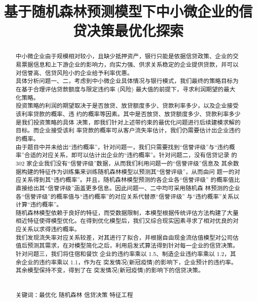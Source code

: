 \documentclass[bwprint]{cumcm}
\title{\heiti 基于随机森林预测模型下中小微企业的信贷决策最优化探索}
\newcommand{\deflabel}[1]{\bf #1\hfill}%
\newenvironment{myproblemlist}[1]%
{\begin{list}{}{\settowidth{\labelwidth}{\bf #1}%
			\setlength{\leftmargin}{\labelwidth}%
			\addtolength{\leftmargin}{\labelsep}%
			\renewcommand{\makelabel}{\deflabel}}}%
	{\end{list}}  %
\begin{document}
    \maketitle
\begin{abstract}
中小微企业由于规模相对较小，且缺少抵押资产，银行只能是依据信贷政策、企业的交易票据信息和上下游企业的影响力，向实力强、供求关系稳定的企业提供贷款，并可以对信誉高、信贷风险小的企业给予利率优惠。\\
\indent 具体分析问题一、二，考虑到中小微企业具体情况与银行模式，我们最终的策略目标为在基于合理评估贷款额度与限定违约率 (风险) 最大值的前提下，寻求利润期望的最大化策略。\\
\indent 投资策略的利润的期望取决于是否放贷、放贷额度多少、贷款利率多少，以及企业接受该利率贷款的概率、违 约的概率等因素。其中是否放贷、放贷额度多少、贷款利率多少是我们投资策略的具体 决策，即我们针对上述带约束的最优化问题进行后续建模求解的目标。而企业接受该利 率贷款的概率可从客户流失率估计，我们仍需要估计出企业违约的概率。\\
\indent 由于题目中并未给出“违约概率”，针对问题一，我们只需要找到“信誉评级”与“违约概 率”合适的对应关系，即可以估计出企业的“违约概率”。针对问题二，没有信贷记录 的 302 家企业我们没有“信誉评级”数据，从而我们利用问题一的“信誉评级”信息及 其余数据构建的特征作为训练集来训练随机森林模型以预测其“信誉评级”，从而由问 题一的对应关系得到其“违约概率”。并且，随机森林模型预测的各企业各“信誉评级” 的概率值比直接给出其“信誉评级”涵盖更多信息。因此问题一、二中均可采用随机森 林预测的企业各“信誉评级”的概率值与“违约概率”的对应关系代替原“信誉评级” 与“违约概率”关系以计算“违约概率”。\\
\indent 随机森林模型依赖于良好的特征，而受数据限制，本模型根据传统评估方法构建了大量相近特征使得模型优化。在得到优化模型后，我们又综合现实因素寻求了相对优良的对应关系以求得违约概率。\\
\indent 我们发现流失率对应关系较差，对其进行了拟合，并根据自由现金流估值模型对公司估值后预测其需求，在对模型简化之后，利用启发式算法得到针对每一企业的信贷决策。\\
\indent 针对问题三，我们将住宿和餐饮 企业的违约率乘以 1.5、制造企业违约率乘以 1.2，其余企业的违约率乘以 1.1，作为在 突发情况(新冠疫情)的影响下，企业预计的违约率。其余模型保持不变，得到了在 突发情况(新冠疫情)的影响下的信贷决策。\\


\\\\
	
关键词：最优化 \quad 随机森林 \quad  信贷决策    \quad 特征工程

\end{abstract}
\end{document}
